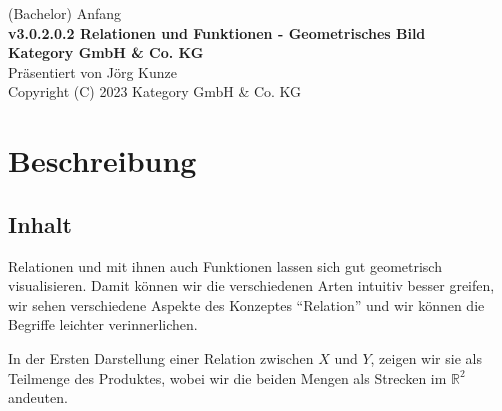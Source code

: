 \documentclass[a4paper]{amsart}
\theoremstyle{definition}
\newcommand{\R}{\ensuremath{\mathbb{ R }}}
\begin{document}
\begin{titlepage}
\centering
{\huge
(Bachelor) Anfang\\[1cm]
\textbf{v3.0.2.0.2 Relationen und Funktionen - Geometrisches Bild}
}\\[1cm]

\textbf{Kategory GmbH \& Co. KG}\\
Präsentiert von Jörg Kunze\\
Copyright (C) 2023 Kategory GmbH \& Co. KG

\end{titlepage}

%

\newpage

\section*{Beschreibung}

\subsection*{Inhalt}
Relationen und mit ihnen auch Funktionen lassen sich gut geometrisch visualisieren. Damit können wir die verschiedenen Arten intuitiv besser greifen, wir sehen verschiedene Aspekte des Konzeptes "`Relation"' und wir können die Begriffe leichter verinnerlichen.

In der Ersten Darstellung einer Relation zwischen $X$ und $Y$, zeigen wir sie als Teilmenge des Produktes, wobei wir die beiden Mengen als Strecken im $\R^2$ andeuten.
\end{document}
